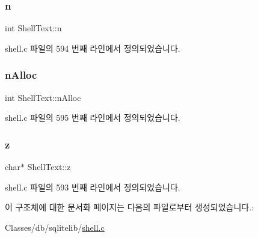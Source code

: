 \subsubsection{\texorpdfstring{n}{n}}
{\footnotesize\ttfamily int Shell\+Text\+::n}



shell.\+c 파일의 594 번째 라인에서 정의되었습니다.

\mbox{\label{struct_shell_text_a44c20e5561668de289aa47e7d65e8ead}} 
\subsubsection{\texorpdfstring{n\+Alloc}{nAlloc}}
{\footnotesize\ttfamily int Shell\+Text\+::n\+Alloc}



shell.\+c 파일의 595 번째 라인에서 정의되었습니다.

\mbox{\label{struct_shell_text_ad7acc0c56c1066a865700d2f472b7069}} 
\subsubsection{\texorpdfstring{z}{z}}
{\footnotesize\ttfamily char$\ast$ Shell\+Text\+::z}



shell.\+c 파일의 593 번째 라인에서 정의되었습니다.



이 구조체에 대한 문서화 페이지는 다음의 파일로부터 생성되었습니다.\+:\begin{DoxyCompactItemize}
\item 
Classes/db/sqlitelib/\hyperlink{shell_8c}{shell.\+c}\end{DoxyCompactItemize}
